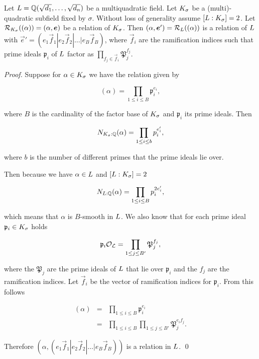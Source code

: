 \begin{mythm}
Let $L = \mathbb{Q}(\sqrt{d_{1}},\ldots,\sqrt{d_{n}})$ be a multiquadratic field.
Let $K_{\sigma}$ be a (multi)-quadratic subfield fixed by $\sigma$.
Without loss of generality assume $[L:K_{\sigma}] = 2$.
Let $\rel {\K \sigma} {(\alpha)} = (\alpha, \vec e)$ be a relation of $K_{\sigma}$.
Then $(\alpha, \vec e') = \rel {\LL} {(\alpha)}$ is a relation of $L$
with $\vec e' = (e_1\vec f_1|e_2\vec f_2|\dots|e_B\vec f_B)$, 
where $\vec f_i$ are the ramification indices such that 
prime ideals $\mathfrak{p}_i$ of $L$ factor as 
$\prod_{f_j \in \vec f_i}\mathfrak{P}_j^{f_j}$.
\end{mythm}
\begin{proof}
Suppose for $\alpha \in K_{\sigma}$ we have the relation given by

\[(\alpha) = \prod_{1\leq i \leq B} \mathfrak{p}_i^{e_i},\]

where $B$ is the cardinality of the factor base of $K_{\sigma}$ and
$\mathfrak{p}_i$ its prime ideals.
Then

\[N_{K_{\sigma}:\mathbb{Q}}(\alpha) = \prod_{1\leq i \leq b} p_i^{e'_i},\]

where $b$ is the number of different primes that the prime ideals lie over.

Then because we have $\alpha \in L$ and $[L:K_{\sigma}] = 2$

\[N_{L:\mathbb{Q}}(\alpha) = \prod_{1\leq i \leq B} p_i^{2e'_i},\]

which means that $\alpha$ is $B$-smooth in $L$.
We also know that for each prime ideal $\mathfrak{p}_i \in K_{\sigma}$ holds 

\[\mathfrak{p}_i\mathcal{O}_\mathcal{L} = \prod_{1\leq j \leq B'}\mathfrak{P}_j^{f_j},\]

where the $\mathfrak{P}_j$ are the prime ideals of $L$ that lie
over $\mathfrak{p}_i$ and the $f_j$ are the ramification indices.
Let $\vec f_i$ be the vector of ramification indices for $\mathfrak{p}_i$.
From this follows

\begin{eqnarray*}
(\alpha) &=& \prod_{1\leq i \leq B} \mathfrak{p}_i^{e_i} \\
&=& \prod_{1\leq i \leq B} \prod_{1\leq j \leq B'} \mathfrak{P}_j^{e_i f_j}.
\end{eqnarray*}

Therefore $(\alpha, (e_1\vec f_1|e_2\vec f_2|\dots|e_B\vec f_B))$ is a 
relation in $L$.
\qed
\end{proof}



